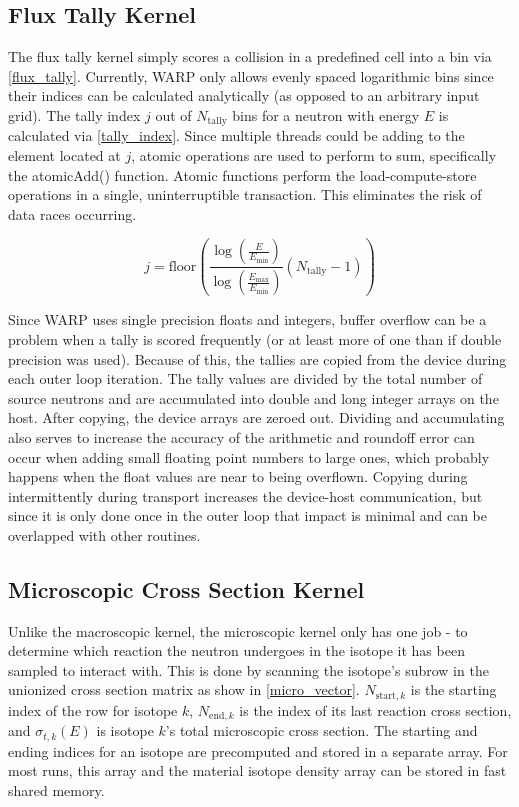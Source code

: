\subsection{Flux Tally Kernel}

The flux tally kernel simply scores a collision in a predefined cell into a bin via \eqref{flux_tally}.  Currently, WARP only allows evenly spaced logarithmic bins since their indices can be calculated analytically (as opposed to an arbitrary input grid).  The tally index $j$ out of $N_\mathrm{tally}$ bins for a neutron with energy $E$ is calculated via \eqref{tally_index}.  Since multiple threads could be adding to the element located at $j$, atomic operations are used to perform to sum, specifically the atomicAdd() function.  Atomic functions perform the load-compute-store operations in a single, uninterruptible transaction.  This eliminates the risk of data races occurring.

\begin{equation}
j = \mathrm{floor} \left( \frac{ \log \left( \frac{E}{E_\mathrm{min}} \right)} { \log \left( \frac{E_\mathrm{max}}{E_\mathrm{min}} \right)} (N_\mathrm{tally}-1) \right)
\label{tally_index}
\end{equation}

Since WARP uses single precision floats and integers, buffer overflow can be a problem when a tally is scored frequently (or at least more of one than if double precision was used).  Because of this, the tallies are copied from the device during each outer loop iteration.  The tally values are divided by the total number of source neutrons and are accumulated into double and long integer arrays on the host.  After copying, the device arrays are zeroed out.  Dividing and accumulating also serves to increase the accuracy of the arithmetic and roundoff error can occur when adding small floating point numbers to large ones, which probably happens when the float values are near to being overflown.  Copying during intermittently during transport increases the device-host communication, but since it is only done once in the outer loop that impact is minimal and can be overlapped with other routines.

\subsection{Microscopic Cross Section Kernel}

Unlike the macroscopic kernel, the microscopic kernel only has one job - to determine which reaction the neutron undergoes in the isotope it has been sampled to interact with.  This is done by scanning the isotope's subrow in the unionized cross section matrix as show in \eqref{micro_vector}.  $N_{\mathrm{start},k}$ is the starting index of the row for isotope $k$, $N_{\mathrm{end},k}$ is the index of its last reaction cross section, and $\sigma_{t,k}(E)$ is isotope $k$'s total microscopic cross section.  The starting and ending indices for an isotope are precomputed and stored in a separate array.  For most runs, this array and the material isotope density array can be stored in fast shared memory.

